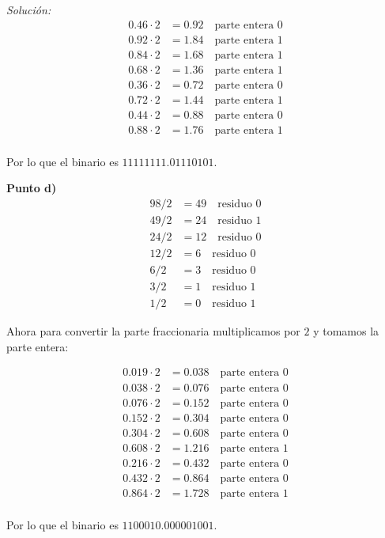 \documentclass{article}
\newenvironment{solution}
    {\textit{Solución:}}
    {}
\begin{document}
\begin{solution}
\begin{align*}
    0.46 \cdot 2 &= 0.92 \quad \text{parte entera } 0\\
    0.92 \cdot 2 &= 1.84 \quad \text{parte entera } 1\\
    0.84 \cdot 2 &= 1.68 \quad \text{parte entera } 1\\
    0.68 \cdot 2 &= 1.36 \quad \text{parte entera } 1\\
    0.36 \cdot 2 &= 0.72 \quad \text{parte entera } 0\\
    0.72 \cdot 2 &= 1.44 \quad \text{parte entera } 1\\
    0.44 \cdot 2 &= 0.88 \quad \text{parte entera } 0\\
    0.88 \cdot 2 &= 1.76 \quad \text{parte entera } 1\\
\end{align*}

Por lo que el binario es $11111111.01110101$.

\textbf{Punto d)}
\begin{align*}
    98/2 &= 49 \quad \text{residuo } 0\\
    49/2 &= 24 \quad \text{residuo } 1\\
    24/2 &= 12 \quad \text{residuo } 0\\
    12/2 &= 6 \quad \text{residuo } 0\\
    6/2 &= 3 \quad \text{residuo } 0\\
    3/2 &= 1 \quad \text{residuo } 1\\
    1/2 &= 0 \quad \text{residuo } 1
\end{align*}

Ahora para convertir la parte fraccionaria multiplicamos por $2$ y tomamos la parte entera:

\begin{align*}
    0.019 \cdot 2 &= 0.038 \quad \text{parte entera } 0\\
    0.038 \cdot 2 &= 0.076 \quad \text{parte entera } 0\\
    0.076 \cdot 2 &= 0.152 \quad \text{parte entera } 0\\
    0.152 \cdot 2 &= 0.304 \quad \text{parte entera } 0\\
    0.304 \cdot 2 &= 0.608 \quad \text{parte entera } 0\\
    0.608 \cdot 2 &= 1.216 \quad \text{parte entera } 1\\
    0.216 \cdot 2 &= 0.432 \quad \text{parte entera } 0\\
    0.432 \cdot 2 &= 0.864 \quad \text{parte entera } 0\\
    0.864 \cdot 2 &= 1.728 \quad \text{parte entera } 1\\
\end{align*}

Por lo que el binario es $1100010.000001001$.

\end{solution}
\end{document}

